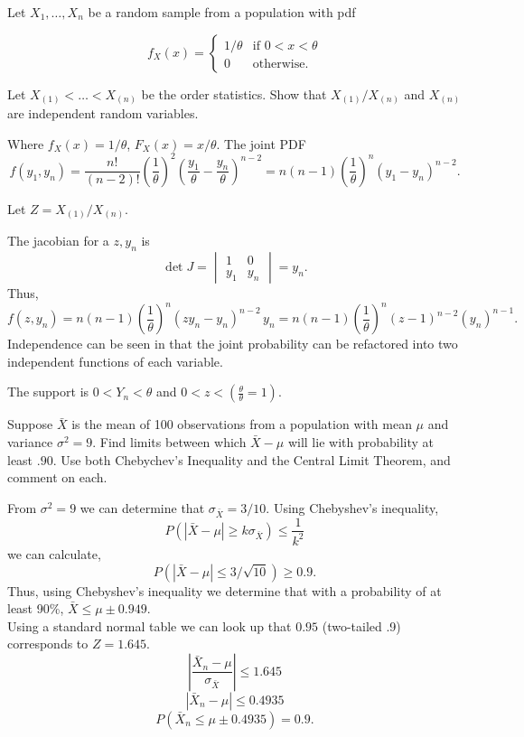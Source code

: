 \documentclass[12pt,letterpaper]{exam}
\begin{document}
\begin{questions}
	\setcounter{question}{23}
	\question 
	Let \(X_1,\ldots, X_n\) be a random sample from a population with pdf
	
	\[
	f_X(x)=
	\begin{cases}
		1/\theta & \text{if } 0 < x < \theta \\
		0 	& \text{otherwise}.
	\end{cases}
	\]
	
	Let \(X_{(1)} < \ldots < X_{(n)}\) be the order statistics. 
	Show that \(X_{(1)}/X_{(n)}\) and \(X_{(n)}\) are independent random variables.
	
	\begin{solution}
		Where \(f_X(x) = 1/\theta\), \(F_X(x) = x/\theta\).
		The joint PDF
		\[f(y_1,y_n) = \frac{n!}{(n-2)!}\left(\frac{1}{\theta}\right)^2 \left(\frac{y_1}{\theta}-\frac{y_{n}}{\theta}\right)^{n-2}
		= n(n-1)\left(\frac{1}{\theta}\right)^n \left({y_1}-y_{n}\right)^{n-2} .\]
		
		Let
		\(Z = X_{(1)}/X_{(n)}.\)
		
		The jacobian for a \(z, y_n\) is
		\[\det J = \begin{vmatrix}1 &0 \\ y_1 &y_n \end{vmatrix} = y_n.\]
		Thus,
		\[
		f(z,y_n) = n(n-1)\left(\frac{1}{\theta}\right)^n \left({zy_{n}}-y_{n}\right)^{n-2} \,y_n
		= n(n-1)\left(\frac{1}{\theta}\right)^n \left(z-1\right)^{n-2} \left(y_{n}\right)^{n-1}.
		\]
		Independence can be seen in that the joint probability can be refactored into two independent functions of each variable.

		The support is \(0<Y_n<\theta\) and \(0<z<(\frac{\theta}{\theta} =1)\).
	\end{solution}

	\setcounter{question}{30}
	\question
	Suppose \(\bar{X}\) is the mean of 100 observations from a population with mean \(\mu\) and variance \(\sigma^2 = 9\). 
	Find limits between which \(\bar{X}-\mu\) will lie with probability at least \(.90\). 
	Use both Chebychev’s Inequality and the Central Limit Theorem, and comment on each. 
	
	\begin{solution}
		From \(\sigma^2=9\) we can determine that \(\sigma_{\bar X} = 3/10\). 
		Using Chebyshev's inequality,
		\[ P(|\bar{X}-\mu|\geq k\sigma_{\bar X}) \leq \frac{1}{k^2}\]
		we can calculate,
		\[ P(|\bar{X}-\mu|\leq 3/\sqrt{10}) \geq 0.9.\]
		Thus, using Chebyshev's inequality we determine that with a probability of at least 90\%, \(\bar{X} \leq \mu\pm0.949\). \\
		
		Using a standard normal table we can look up that \(0.95\) (two-tailed .9) corresponds to \(Z=1.645\).	
		\[ \left| \frac{ \bar{X}_n-\mu }{ \sigma_{\bar{X}} } \right| \leq 1.645\]
		\[ \left| \bar{X}_n-\mu \right| \leq 0.4935\]
		\[ P(\bar{X}_n \leq \mu \pm 0.4935) = 0.9.\]
	\end{solution}
		

\end{questions}
\end{document}
